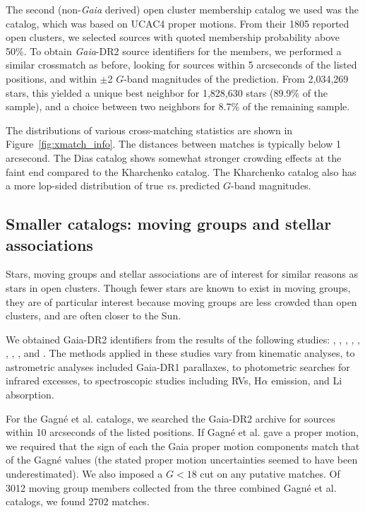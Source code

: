 \documentclass[12pt,twocolumn,tighten]{aastex62}
\begin{document}
The second (non-{\it Gaia} derived) open cluster membership catalog we
used was the \citet{dias_proper_2014} catalog, which was based on
UCAC4 proper motions.
From their 1805 reported open clusters, we selected sources with
quoted membership probability above 50\%.
To obtain {\it Gaia}-DR2 source identifiers for the members, we
performed a similar crossmatch as before, looking for sources within 5
arcseconds of the listed positions, and within $\pm$2 $G$-band
magnitudes of the prediction.
From 2{,}034{,}269 stars, this yielded a unique
best neighbor for 1{,}828{,}630 stars (89.9\% of the sample), and a choice
between two neighbors for 8.7\% of the remaining sample. 

The distributions of various cross-matching statistics are shown in
Figure~\ref{fig:xmatch_info}.  The distances between matches is
typically below 1 arcsecond.  The Dias catalog shows somewhat stronger
crowding effects at the faint end compared to the Kharchenko catalog.
The Kharchenko catalog also has a more lop-sided distribution of true
{\it vs.}$\,$predicted $G$-band magnitudes.


\subsection{Smaller catalogs: moving groups and stellar associations}
\label{subsec:mg}

Stars, moving groups and stellar associations are of interest for
similar reasons as stars in open clusters.  Though fewer stars
are known to exist in moving groups, they are of particular interest
because moving groups are less crowded than open clusters, and are
often closer to the Sun.

We obtained Gaia-DR2 identifiers from the results of the following
studies:
\citet{gagne_banyan_XI_2018},
\citet{gagne_banyan_XII_2018},
\citet{gagne_banyan_XIII_2018},
\citet{kraus_tucanahor_2014},
\citet{roser_deep_2011}, %
\citet{bell_32ori_2017},
\citet{rizzuto_multidimensional_2011},
\citet{oh_comoving_2017}, and
\citet{zari_3d_2018}. The methods applied in these studies
vary from kinematic analyses, to astrometric analyses included
Gaia-DR1 parallaxes, to photometric searches for infrared excesses, to
spectroscopic studies including RVs, H$\alpha$
emission, and Li absorption.

For the Gagn\'e et al{.} catalogs, we searched the Gaia-DR2 archive for
sources within 10 arcseconds of the listed positions.  If Gagn\'e et
al{.} gave a proper motion, we required that the sign of each the Gaia
proper motion components match that of the Gagn\'e values (the stated
proper motion uncertainties seemed to have been underestimated).  We
also imposed a $G<18$ cut on any putative matches.  Of 3012 moving
group members collected from the three combined Gagn\'e et al{.}
catalogs, we found 2702 matches.
\end{document}
